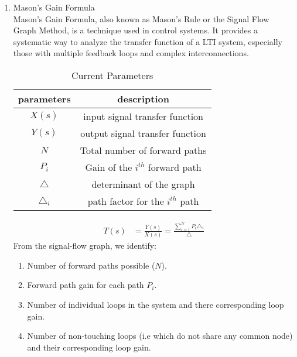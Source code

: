 \begin{enumerate}[label=\thechapter.\arabic*,ref=\thechapter.\theenumi]

\item{Mason's Gain Formula}\\

Mason’s Gain Formula, also known as Mason’s Rule or the Signal Flow Graph Method, is a technique used in control systems. It provides a systematic way to analyze the transfer function of a LTI system, especially those with multiple feedback loops and complex interconnections.

\begin{table}[!ht]
\begin{tabular}{|c|c|}
	\hline
	\textbf{parameters} & \textbf{description}\\
	\hline
	$X(s)$ & input signal transfer function\\
	\hline
	$Y(s)$ & output signal transfer function\\
	\hline
	$N$ & Total number of forward paths\\
	\hline
	$P_i$ & Gain of the $i^{th}$ forward path\\
	\hline
	$\triangle$ & determinant of the graph\\
	\hline
	$\triangle_i$ & path factor for the $i^{th}$ path\\
	\hline
\end{tabular}
\caption{Current Parameters}
\end{table}
\begin{align}
T(s) &= \frac{Y(s)}{X(s)} = \frac{\sum_{i=1}^{N}P_i\triangle_i}{\triangle}
\end{align}
\newpage From the signal-flow graph, we identify:\\
\begin{enumerate}
\item Number of forward paths possible ($N$).\\
\item Forward path gain for each path $P_{i}$.\\
\item Number of individual loops in the system and there corresponding loop gain.\\
\item Number of non-touching loops (i.e which do not share any common node) and their corresponding loop gain.
\end{enumerate}


\end{enumerate}
